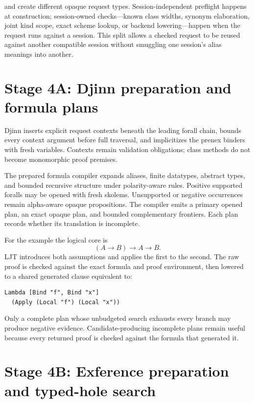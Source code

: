 \documentclass[10pt,letterpaper,oneside]{report}
\newcommand{\code}[1]{\texttt{\detokenize{#1}}}
\begin{document}
\code{mkDjinnRequest} and \code{mkExferenceRequest} create different opaque request types. Session-independent preflight happens at construction; session-owned checks---known class widths, synonym elaboration, joint kind scope, exact scheme lookup, or backend lowering---happen when the request runs against a session. This split allows a checked request to be reused against another compatible session without smuggling one session's alias meanings into another.

\section{Stage 4A: Djinn preparation and formula plans}

Djinn inserts explicit request contexts beneath the leading forall chain, bounds every context argument before full traversal, and implicitizes the prenex binders with fresh variables. Contexts remain validation obligations; class methods do not become monomorphic proof premises.

The prepared formula compiler expands aliases, finite datatypes, abstract types, and bounded recursive structure under polarity-aware rules. Positive supported foralls may be opened with fresh skolems. Unsupported or negative occurrences remain alpha-aware opaque propositions. The compiler emits a primary opened plan, an exact opaque plan, and bounded complementary frontiers. Each plan records whether its translation is incomplete.

For the example the logical core is
\[
  (A \to B) \to A \to B.
\]
LJT introduces both assumptions and applies the first to the second. The raw proof is checked against the exact formula and proof environment, then lowered to a shared generated clause equivalent to:

\begin{lstlisting}[language=Haskellish]
Lambda [Bind "f", Bind "x"]
  (Apply (Local "f") (Local "x"))
\end{lstlisting}

Only a complete plan whose unbudgeted search exhausts every branch may produce negative evidence. Candidate-producing incomplete plans remain useful because every returned proof is checked against the formula that generated it.

\section{Stage 4B: Exference preparation and typed-hole search}
\end{document}

